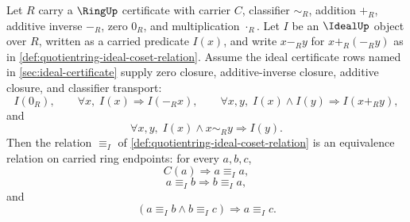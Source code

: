 \begin{theorem}
\label{thm:quotientring-ideal-coset-equivalence}
Let $R$ carry a $\RingUp$ certificate with carrier $C$, classifier $\sim_R$, addition $+_R$, additive inverse $-_R$, zero $0_R$, and multiplication $\cdot_R$. Let $I$ be an $\IdealUp$ object over $R$, written as a carried predicate $I(x)$, and write $x-_R y$ for $x+_R(-_R y)$ as in \autoref{def:quotientring-ideal-coset-relation}. Assume the ideal certificate rows named in \autoref{sec:ideal-certificate} supply zero closure, additive-inverse closure, additive closure, and classifier transport:
$$
I(0_R),\qquad
\forall x,\; I(x)\Longrightarrow I(-_R x),\qquad
\forall x,y,\; I(x)\land I(y)\Longrightarrow I(x+_R y),
$$
and
$$
\forall x,y,\; I(x)\land x\sim_R y\Longrightarrow I(y).
$$
Then the relation $\equiv_I$ of \autoref{def:quotientring-ideal-coset-relation} is an equivalence relation on carried ring endpoints: for every $a,b,c$,
$$
C(a)\Longrightarrow a\equiv_I a,
$$
$$
a\equiv_I b\Longrightarrow b\equiv_I a,
$$
and
$$
(a\equiv_I b\land b\equiv_I c)\Longrightarrow a\equiv_I c.
$$
\end{theorem}
